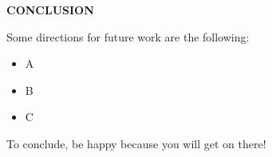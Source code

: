 \clearpage
\noindent\textbf{CONCLUSION}
$\!$\\

\lipsum[3-5]

Some directions for future work are the following:
\begin{itemize}
\item A
\item B
\item C
\end{itemize}

To conclude, be happy because you will get on there!










